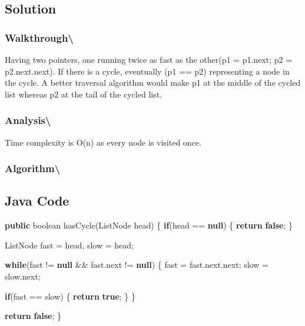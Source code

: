 \documentclass[]{book}
\newenvironment{Shaded}{\begin{snugshade}}{\end{snugshade}}
\newcommand{\DataTypeTok}[1]{\textcolor[rgb]{0.13,0.29,0.53}{#1}}
\newcommand{\FunctionTok}[1]{\textcolor[rgb]{0.00,0.00,0.00}{#1}}
\newcommand{\KeywordTok}[1]{\textcolor[rgb]{0.13,0.29,0.53}{\textbf{#1}}}
\newcommand{\NormalTok}[1]{#1}
\begin{document}
\hypertarget{solution-62}{%
\subsection{Solution}\label{solution-62}}

\hypertarget{walkthrough-105}{%
\subsubsection{Walkthrough\textbackslash{}}\label{walkthrough-105}}

Having two pointers, one running twice as fast as the other(p1 = p1.next; p2 = p2.next.next). If there is a
cycle, eventually (p1 == p2) representing a node in the cycle. A better traversal algorithm would make p1 at
the middle of the cycled list whereas p2 at the tail of the cycled list.

\hypertarget{analysis-112}{%
\subsubsection{Analysis\textbackslash{}}\label{analysis-112}}

Time complexity is O(n) as every node is visited once.

\hypertarget{algorithm-118}{%
\subsubsection{Algorithm\textbackslash{}}\label{algorithm-118}}

\hypertarget{java-code-69}{%
\subsection{Java Code}\label{java-code-69}}

\begin{Shaded}
\begin{Highlighting}[]
\KeywordTok{public} \DataTypeTok{boolean} \FunctionTok{hasCycle}\NormalTok{(ListNode head) \{}
    \KeywordTok{if}\NormalTok{(head == }\KeywordTok{null}\NormalTok{) \{}
        \KeywordTok{return} \KeywordTok{false}\NormalTok{;}
\NormalTok{    \}}

\NormalTok{    ListNode fast = head, slow = head;}

    \KeywordTok{while}\NormalTok{(fast != }\KeywordTok{null}\NormalTok{ && fast.}\FunctionTok{next}\NormalTok{ != }\KeywordTok{null}\NormalTok{) \{}
\NormalTok{        fast = fast.}\FunctionTok{next}\NormalTok{.}\FunctionTok{next}\NormalTok{;}
\NormalTok{        slow = slow.}\FunctionTok{next}\NormalTok{;}

        \KeywordTok{if}\NormalTok{(fast == slow) \{}
            \KeywordTok{return} \KeywordTok{true}\NormalTok{;}
\NormalTok{        \}}
\NormalTok{    \}}

    \KeywordTok{return} \KeywordTok{false}\NormalTok{;}
\NormalTok{\}}
\end{Highlighting}
\end{Shaded}
\end{document}
